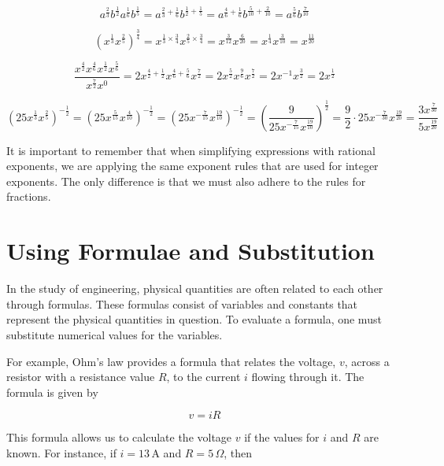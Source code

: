 \begin{example}

\[
a^{\frac{2}{3}}b^{\frac{1}{2}}a^{\frac{1}{6}}b^{\frac{1}{5}} = a^{\frac{2}{3}+\frac{1}{6}}b^{\frac{1}{2}+\frac{1}{5}} = a^{\frac{4}{6}+\frac{1}{6}}b^{\frac{5}{10}+\frac{2}{10}} = a^{\frac{5}{6}}b^{\frac{7}{10}}
\]

\[
\left( x^{\frac{1}{3}} x^{\frac{2}{5}} \right)^{\frac{3}{4}} = x^{\frac{1}{3} \times \frac{3}{4}} x^{\frac{2}{5} \times \frac{3}{4}} = x^{\frac{3}{12}} x^{\frac{6}{20}} = x^{\frac{1}{4}} x^{\frac{3}{10}} = x^{\frac{11}{20}}
\]

\[
\frac{x^{\frac{4}{2}}x^{\frac{4}{6}}x^{\frac{1}{2}}x^{\frac{5}{6}}}{x^{\frac{7}{2}}x^0} = 2x^{\frac{4}{2}+\frac{1}{2}}x^{\frac{4}{6}+\frac{5}{6}} x^{\frac{7}{2}} = 2x^{\frac{5}{2}} x^{\frac{9}{6}} x^{\frac{7}{2}} = 2x^{-1} x^{\frac{3}{2}} = 2x^{\frac{1}{2}}
\]

\[
\left( 25x^{\frac{1}{3}} x^{\frac{2}{5}} \right)^{-\frac{1}{2}} = \left( 25x^{\frac{5}{15}} x^{\frac{4}{10}} \right)^{-\frac{1}{2}} = \left( 25x^{-\frac{7}{15}} x^{\frac{19}{10}} \right)^{-\frac{1}{2}} = \left( \frac{9}{25x^{-\frac{7}{15}}x^{\frac{19}{10}}} \right)^{\frac{1}{2}} = \frac{9}{2} \cdot 25x^{-\frac{7}{30}} x^{\frac{19}{20}} = \frac{3x^{\frac{7}{30}}}{5x^{\frac{19}{20}}}
\]
\end{example}

It is important to remember that when simplifying expressions with rational exponents, we are applying the same exponent rules that are used for integer exponents. The only difference is that we must also adhere to the rules for fractions.

\section{Using Formulae and Substitution}
In the study of engineering, physical quantities are often related to each other through formulas. These formulas consist of variables and constants that represent the physical quantities in question. To evaluate a formula, one must substitute numerical values for the variables.

For example, Ohm’s law provides a formula that relates the voltage, \(v\), across a resistor with a resistance value \(R\), to the current \(i\) flowing through it. The formula is given by

\[
v = iR
\]

This formula allows us to calculate the voltage \(v\) if the values for \(i\) and \(R\) are known. For instance, if \(i = 13 \, \text{A}\) and \(R = 5 \, \Omega\), then

